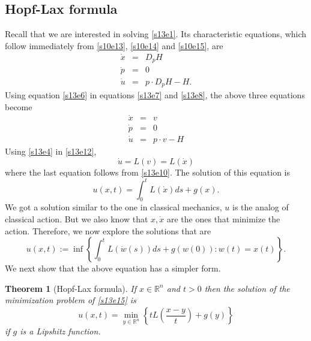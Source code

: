 \documentclass{article}
\theoremstyle{plain}
\newtheorem{thm}{Theorem}
\numberwithin{thm}{section}
\theoremstyle{plain}
\numberwithin{prop}{section}
\theoremstyle{definition}
\numberwithin{defn}{section}
\theoremstyle{remark}
\numberwithin{equation}{section}
\begin{document}
\subsection{Hopf-Lax formula}
Recall that we are interested in solving \eqref{s13e1}. Its characteristic equations, which follow
immediately from \eqref{s10e13}, \eqref{s10e14} and \eqref{s10e15}, are
\begin{eqnarray}
\dot{x} &=& D_p H \label{s13e7} \\
\dot{p} &=& 0 \label{s13e8} \\
\dot{u} &=& p\cdot D_p H - H. \label{s13e9}
\end{eqnarray}
Using equation \eqref{s13e6} in equations \eqref{s13e7} and \eqref{s13e8}, the above three equations
become
\begin{eqnarray}
\dot{x} &=& v \label{s13e10} \\
\dot{p} &=& 0 \label{s13e11} \\
\dot{u} &=& p\cdot v - H \label{s13e12}
\end{eqnarray}
Using \eqref{s13e4} in \eqref{s13e12},
\begin{equation}\label{s13e13}
\dot{u} = L(v) = L(\dot{x})
\end{equation}
where the last equation follows from \eqref{s13e10}. The solution of this equation is
\begin{equation}\label{s13e14}
u(x, t) = \int_0^t L(\dot{x})ds + g(x).
\end{equation}
We got a solution similar to the one in classical mechanics, $u$ is the analog of classical action.
But we also know that $x, \dot{x}$ are the ones that minimize the action. Therefore, we now explore 
the solutions that are
\begin{equation}\label{s13e15}
u(x, t) := \inf\left\{\int_0^t L(\dot{w}(s))ds + g(w(0)) : w(t) = x(t)\right\}.
\end{equation}
We next show that the above equation has a simpler form.
\begin{thm}[Hopf-Lax formula]\label{s13t1}
If $x \in \mathbb{R}^n$ and $t > 0$ then the solution of the minimization problem of \eqref{s13e15}
is
\[
u(x, t) = \min_{y \in \mathbb{R}^n}\left\{tL\left(\frac{x - y}{t}\right) + g(y)\right\}
\]
if $g$ is a Lipshitz function.
\end{thm}
\end{document}
